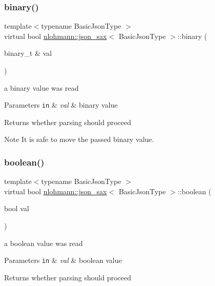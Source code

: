 \subsubsection{\texorpdfstring{binary()}{binary()}}
{\footnotesize\ttfamily template$<$typename Basic\+Json\+Type $>$ \\
virtual bool \hyperlink{structnlohmann_1_1json__sax}{nlohmann\+::json\+\_\+sax}$<$ Basic\+Json\+Type $>$\+::binary (\begin{DoxyParamCaption}\item[{binary\+\_\+t \&}]{val }\end{DoxyParamCaption})\hspace{0.3cm}{\ttfamily [pure virtual]}}



a binary value was read 


\begin{DoxyParams}[1]{Parameters}
\mbox{\tt in}  & {\em val} & binary value \\
\hline
\end{DoxyParams}
\begin{DoxyReturn}{Returns}
whether parsing should proceed 
\end{DoxyReturn}
\begin{DoxyNote}{Note}
It is safe to move the passed binary value. 
\end{DoxyNote}
\mbox{\label{structnlohmann_1_1json__sax_a82ed080814fa656191a537284bb0c575}} 
\subsubsection{\texorpdfstring{boolean()}{boolean()}}
{\footnotesize\ttfamily template$<$typename Basic\+Json\+Type $>$ \\
virtual bool \hyperlink{structnlohmann_1_1json__sax}{nlohmann\+::json\+\_\+sax}$<$ Basic\+Json\+Type $>$\+::boolean (\begin{DoxyParamCaption}\item[{bool}]{val }\end{DoxyParamCaption})\hspace{0.3cm}{\ttfamily [pure virtual]}}



a boolean value was read 


\begin{DoxyParams}[1]{Parameters}
\mbox{\tt in}  & {\em val} & boolean value \\
\hline
\end{DoxyParams}
\begin{DoxyReturn}{Returns}
whether parsing should proceed 
\end{DoxyReturn}
\mbox{\label{structnlohmann_1_1json__sax_a235ee975617f28e6a996d1e36a282312}} 
